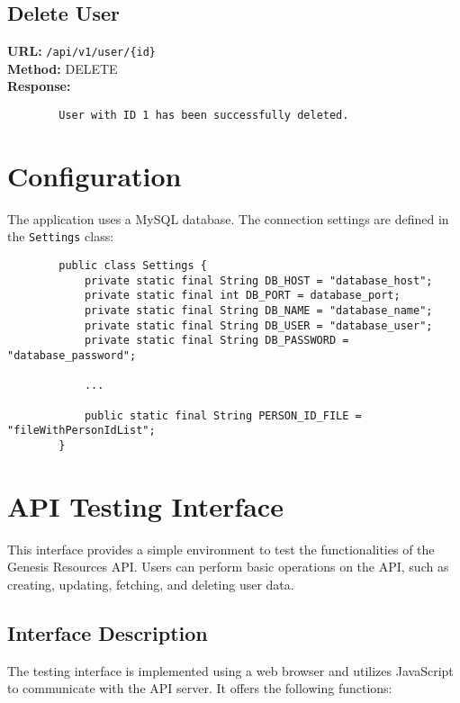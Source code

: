 \documentclass[12pt]{article}
\begin{document}
	\newpage

	\subsection{Delete User}

	\textbf{URL:} \texttt{/api/v1/user/\{id\}} \\
	\textbf{Method:} DELETE \\
	\textbf{Response:}
	\begin{verbatim}
		User with ID 1 has been successfully deleted.
	\end{verbatim}

	\newpage

	\section{Configuration}

	The application uses a MySQL database. The connection settings are defined in the \texttt{Settings} class:

	\begin{verbatim}
		public class Settings {
			private static final String DB_HOST = "database_host";
			private static final int DB_PORT = database_port;
			private static final String DB_NAME = "database_name";
			private static final String DB_USER = "database_user";
			private static final String DB_PASSWORD = "database_password";

			...

			public static final String PERSON_ID_FILE = "fileWithPersonIdList";
		}
	\end{verbatim}

	\newpage

	\section{API Testing Interface}

	This interface provides a simple environment to test the functionalities of the Genesis Resources API. Users can perform basic operations on the API, such as creating, updating, fetching, and deleting user data.

	\subsection{Interface Description}

	The testing interface is implemented using a web browser and utilizes JavaScript to communicate with the API server. It offers the following functions:
\end{document}
